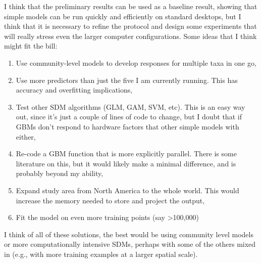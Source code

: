 \documentclass[a4paper]{article}
\begin{document}
 I think that the preliminary results can be used as a baseline result, showing that simple models can be run quickly and efficiently on standard desktops, but I think that it is necessary to refine the protocol and design some experiments that will really stress even the larger computer configurations.  Some ideas that I think might fit the bill:
 
\begin{enumerate}
\item Use community-level models to develop responses for multiple taxa in one go,
\item Use more predictors than just the five I am currently running.  This has accuracy and overfitting implications,
\item Test other SDM algorithms (GLM, GAM, SVM, etc).  This is an easy way out, since it's just a couple of lines of code to change, but I doubt that if GBMs don't respond to hardware factors that other simple models with either,
\item Re-code a GBM function that is more explicitly parallel.  There is some literature on this, but it would likely make a minimal difference, and is probably beyond my ability,
\item Expand study area from North America to the whole world.  This would increase the memory needed to store and project the output,
\item Fit the model on even more training points (say >100,000)
\end{enumerate}

I think of all of these solutions, the best would be using community level models or more computationally intensive SDMs, perhaps with some of the others mixed in (e.g., with more training examples at a larger spatial scale).  
\end{document}
